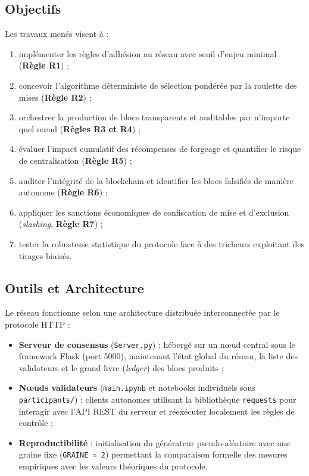 \documentclass[11pt,a4paper]{article}
\begin{document}
\subsection{Objectifs}
Les travaux menés visent à :
\begin{enumerate}
    \item implémenter les règles d'adhésion au réseau avec seuil d'enjeu minimal (\textbf{Règle R1}) ;
    \item concevoir l'algorithme déterministe de sélection pondérée par la roulette des mises (\textbf{Règle R2}) ;
    \item orchestrer la production de blocs transparents et auditables par n'importe quel nœud (\textbf{Règles R3 et R4}) ;
    \item évaluer l'impact cumulatif des récompenses de forgeage et quantifier le risque de centralisation (\textbf{Règle R5}) ;
    \item auditer l'intégrité de la blockchain et identifier les blocs falsifiés de manière autonome (\textbf{Règle R6}) ;
    \item appliquer les sanctions économiques de confiscation de mise et d'exclusion (\emph{slashing}, \textbf{Règle R7}) ;
    \item tester la robustesse statistique du protocole face à des tricheurs exploitant des tirages biaisés.
\end{enumerate}

\subsection{Outils et Architecture}
Le réseau fonctionne selon une architecture distribuée interconnectée par le protocole HTTP :
\begin{itemize}
    \item \textbf{Serveur de consensus} (\texttt{Server.py}) : hébergé sur un nœud central sous le framework Flask (port 5000), maintenant l'état global du réseau, la liste des validateurs et le grand livre (\emph{ledger}) des blocs produits ;
    \item \textbf{Nœuds validateurs} (\texttt{main.ipynb} et notebooks individuels sous \texttt{participants/}) : clients autonomes utilisant la bibliothèque \texttt{requests} pour interagir avec l'API REST du serveur et réexécuter localement les règles de contrôle ;
    \item \textbf{Reproductibilité} : initialisation du générateur pseudo-aléatoire avec une graine fixe (\texttt{GRAINE = 2}) permettant la comparaison formelle des mesures empiriques avec les valeurs théoriques du protocole.
\end{itemize}
\end{document}
